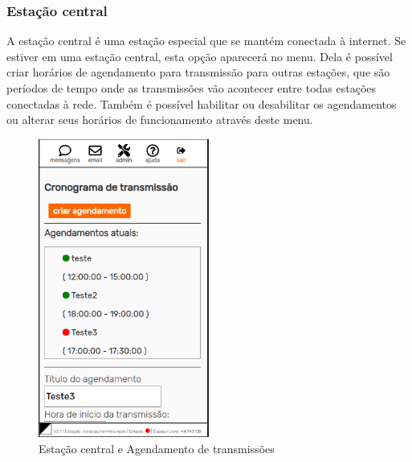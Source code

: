 \documentclass[11pt,a4paper]{article}
\begin{document}
\subsubsection{Estação central} 
\label{gui_central_station}

A estação central é uma estação especial que se mantém conectada à internet. Se estiver em uma estação central, esta opção aparecerá no menu. Dela é possível criar horários de agendamento para transmissão para outras estações, que são períodos de tempo onde as transmissões vão acontecer entre todas estações conectadas à rede. Também é possível habilitar ou desabilitar os agendamentos ou alterar seus horários de funcionamento através deste menu.


\begin{figure}[H]
    \centering
    \includegraphics[width=0.5\textwidth]{screenshots/frontend/pt_kn/central.png}
    \caption{Estação central e Agendamento de transmissões}
	\vspace{-10pt}
    \label{fig:central}
\end{figure} 
\end{document}
